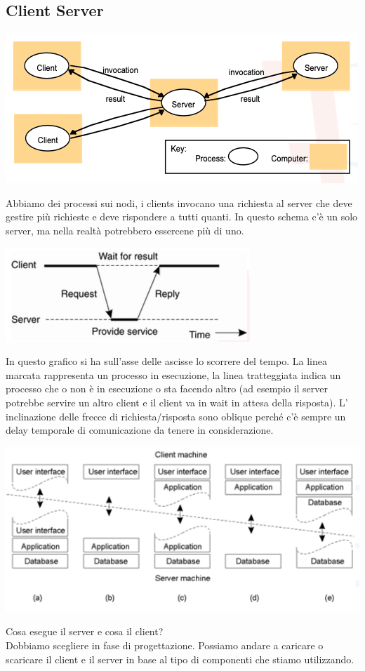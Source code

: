 \subsection{Client Server}
\begin{center}
    \includegraphics[width = .6\textwidth]{images/lezione2/cs-schema.png}
\end{center}
Abbiamo dei processi sui nodi, i clients invocano una richiesta al server che deve gestire più richieste e deve rispondere a tutti quanti. In questo schema c'è un solo server, ma nella realtà potrebbero essercene più di uno.
\begin{center}
    \includegraphics[width = .6\textwidth]{images/lezione2/CS.png}
\end{center}
In questo grafico si ha sull'asse delle ascisse lo scorrere del tempo. La linea marcata rappresenta un processo in esecuzione, la linea tratteggiata indica un processo che o non è in esecuzione o sta facendo altro (ad esempio il server potrebbe servire un altro client e il client va in wait in attesa della risposta).
L' inclinazione delle frecce di richiesta/risposta sono oblique perché c'è sempre un delay temporale di comunicazione da tenere in considerazione.

\begin{center}
    \includegraphics[width = .7\textwidth]{images/lezione2/bilanciamento.png}
\end{center}
Cosa esegue il server e cosa il client?\\
Dobbiamo scegliere in fase di progettazione.
Possiamo andare a caricare o scaricare il client e il server in base al tipo di componenti che stiamo utilizzando. 

